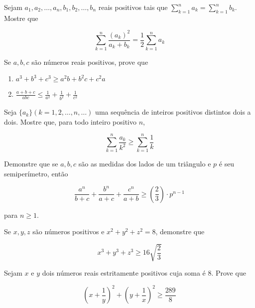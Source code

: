 \begin{questao}
  Sejam $a_1,a_2,\ldots,a_n,b_1,b_2,\ldots,b_n$ reais positivos tais que
  $\sum_{k=1}^{n}a_k = \sum_{k=1}^{n}b_k$. Mostre que

  $$ \sum_{k=1}^{n}\frac{(a_k)^2}{a_k+b_k} = \frac{1}{2} \sum_{k=1}^{n}a_k $$
\end{questao}

\begin{questao}
  Se $a,b,c$ são números reais positivos, prove que

  \begin{enumerate}

  \item $a^3+b^3+c^3 \geq a^2b+b^2c+c^2a$

  \item $\frac{a+b+c}{abc} \leq \frac{1}{a^2}+\frac{1}{b^2}+\frac{1}{c^2}$
  \end{enumerate}

\end{questao}

\begin{questao}
  Seja $\{a_k\}(k=1,2,\ldots,n,\ldots)$ uma sequência de inteiros positivos
  distintos dois a dois. Mostre que, para todo inteiro positivo $n$,

  $$ \sum_{k=1}^{n}\frac{a_k}{k^2} \geq \sum_{k=1}^{n}\frac{1}{k} $$
\end{questao}

\begin{questao}
  Demonstre que se $a,b,c$ são as medidas dos lados de um triângulo e $p$ é seu
  semiperímetro, então

  $$ \frac{a^n}{b+c} + \frac{b^n}{a+c} + \frac{c^n}{a+b} \geq \left( \frac{2}{3}
  \right) \cdot p^{n-1} $$

  para $n \geq 1$.
\end{questao}

\begin{questao}
  Se $x,y,z$ são números positivos e $x^2+y^2+z^2=8$, demonstre que

  $$ x^3+y^3+z^3 \geq 16 \sqrt{\frac{2}{3}} $$
\end{questao}

\begin{questao}
  Sejam $x$ e $y$ dois números reais estritamente positivos cuja soma é
  $8$. Prove que

  $$ \left( x+\frac{1}{y} \right)^2 + \left( y+\frac{1}{x} \right)^2 \geq
  \frac{289}{8} $$
\end{questao}

